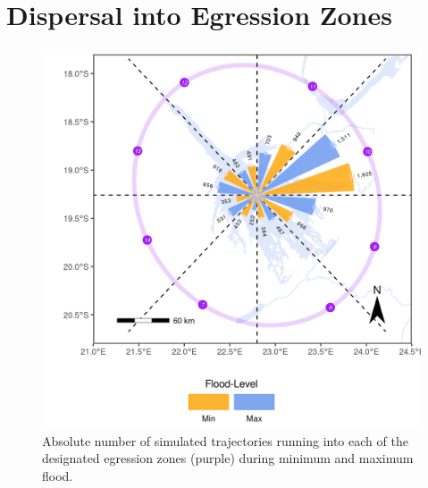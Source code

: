 \documentclass[abstract=on,10pt,a4paper,bibliography=totocnumbered]{article}
\begin{document}
\newpage
\section{Dispersal into Egression Zones}
\begin{figure}[htbp]
  \begin{center}
  \includegraphics[width = \textwidth]{Figures/Egression.png}
  \caption{Absolute number of simulated trajectories running into each of the
  designated egression zones (purple) during minimum and maximum flood.}
  \label{Egression}
  \end{center}
\end{figure}

\newpage
\end{document}
